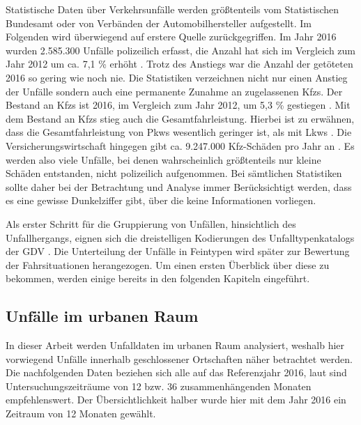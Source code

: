 Statistische Daten über Verkehrsunfälle werden größtenteils vom Statistischen Bundesamt oder von Verbänden der Automobilhersteller aufgestellt. Im Folgenden wird überwiegend auf erstere Quelle zurückgegriffen. Im Jahr 2016 wurden 2.585.300 Unfälle polizeilich erfasst, die Anzahl hat sich im Vergleich zum Jahr 2012 um ca. 7,1 \% erhöht \parencite[S. 5]{StatistischesBundesamt.2018}. Trotz des Anstiegs war die Anzahl der getöteten 2016 so gering wie noch nie. Die Statistiken verzeichnen nicht nur einen Anstieg der Unfälle sondern auch eine permanente Zunahme an zugelassenen \acp{Kfz}. Der Bestand an \acp{Kfz} ist 2016, im Vergleich zum Jahr 2012, um 5,3 \% gestiegen \parencite[S. 5]{StatistischesBundesamt.2018}. Mit dem Bestand an \aclp{Kfz} stieg auch die Gesamtfahrleistung. Hierbei ist zu erwähnen, dass die Gesamtfahrleistung von Pkws wesentlich geringer ist, als mit Lkws \parencite[S. 150]{BundesministeriumfurVerkehrunddigitaleInfrastruktur.2017}. Die Versicherungswirtschaft hingegen gibt ca. 9.247.000 \acs{Kfz}-Schäden pro Jahr an \parencite[S. 27]{Burg.2017}. Es werden also viele Unfälle, bei denen wahrscheinlich größtenteils nur kleine Schäden entstanden, nicht polizeilich aufgenommen. Bei sämtlichen Statistiken sollte daher bei der Betrachtung und Analyse immer Berücksichtigt werden, dass es eine gewisse Dunkelziffer gibt, über die keine Informationen vorliegen.

Als erster Schritt für die Gruppierung von Unfällen, hinsichtlich des Unfallhergangs, eignen sich die dreistelligen Kodierungen des Unfalltypenkatalogs der \ac{GDV} \parencite[S. 18]{Vollrath.2006}. Die Unterteilung der Unfälle in Feintypen wird später zur Bewertung der Fahrsituationen herangezogen. Um einen ersten Überblick über diese zu bekommen, werden einige bereits in den folgenden Kapiteln eingeführt.

\subsection{Unfälle im urbanen Raum}
In dieser Arbeit werden Unfalldaten im urbanen Raum analysiert, weshalb hier vorwiegend Unfälle innerhalb geschlossener Ortschaften näher betrachtet werden. Die nachfolgenden Daten beziehen sich alle auf das Referenzjahr 2016, laut \Textcite[S. 11]{ForschungsgesellschaftfurStraenundVerkehrswesen.2012} sind Untersuchungszeiträume von 12 bzw. 36 zusammenhängenden Monaten empfehlenswert. Der Übersichtlichkeit halber wurde hier mit dem Jahr 2016 ein Zeitraum von 12 Monaten gewählt.


